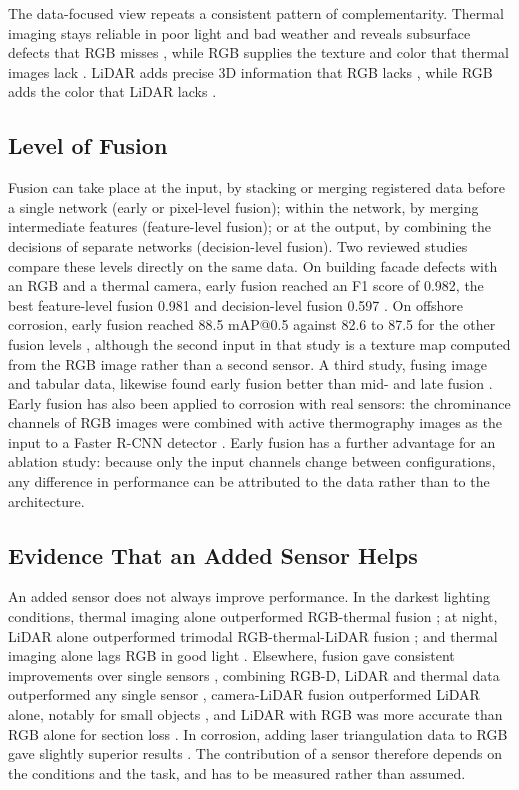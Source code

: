 The data-focused view repeats a consistent pattern of complementarity. Thermal
imaging stays reliable in poor light and bad weather \citep{Lin2022,Jiang2024} and reveals
subsurface defects that RGB misses \citep{Yang2023,Shahsavarani2024}, while RGB supplies the texture and
color that thermal images lack \citep{Liu2025a,Xu2026}. LiDAR adds precise 3D information that
RGB lacks \citep{Zhang2026d}, while RGB adds the color that LiDAR lacks \citep{Gunatilake2021}.

\subsection{Level of Fusion}

Fusion can take place at the input, by stacking or merging registered data before
a single network (early or pixel-level fusion); within the network, by merging
intermediate features (feature-level fusion); or at the output, by combining the
decisions of separate networks (decision-level fusion). Two reviewed studies
compare these levels directly on the same data. On building facade defects with
an RGB and a thermal camera, early fusion reached an F1 score of 0.982, the best
feature-level fusion 0.981 and decision-level fusion 0.597 \citep{Yang2023}. On offshore
corrosion, early fusion reached 88.5 mAP@0.5 against 82.6 to 87.5 for the other
fusion levels \citep{Mao2026}, although the second input in that study is a texture map
computed from the RGB image rather than a second sensor. A third study, fusing
image and tabular data, likewise found early fusion better than mid- and late
fusion \citep{Chowdhury2026}. Early fusion has also been applied to corrosion with real sensors:
the chrominance channels of RGB images were combined with active thermography
images as the input to a Faster R-CNN detector \citep{Lim2021}. Early fusion has a further
advantage for an ablation study: because only the input channels change between
configurations, any difference in performance can be attributed to the data
rather than to the architecture.

\subsection{Evidence That an Added Sensor Helps}

An added sensor does not always improve performance. In the darkest lighting
conditions, thermal imaging alone outperformed RGB-thermal fusion \citep{Jiang2024}; at
night, LiDAR alone outperformed trimodal RGB-thermal-LiDAR fusion \citep{Tran2025}; and
thermal imaging alone lags RGB in good light \citep{Liu2025b}. Elsewhere, fusion gave
consistent improvements over single sensors \citep{Liu2025}, combining RGB-D, LiDAR and
thermal data outperformed any single sensor \citep{Yang2024}, camera-LiDAR
fusion outperformed LiDAR alone, notably for small objects \citep{Cheng2025}, and LiDAR with
RGB was more accurate than RGB alone for section loss \citep{Maru2025}. In corrosion, adding
laser triangulation data to RGB gave slightly superior results
\citep{Haitz2022}. The contribution of a sensor therefore depends on the conditions and the
task, and has to be measured rather than assumed.

